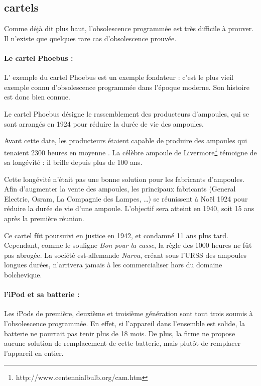 \subsection{cartels}



Comme déjà dit plus haut, l'obsolescence programmée est très difficile à prouver. Il n'existe que quelques rare cas d'obsolescence prouvée. 

\paragraph*{Le cartel Phoebus : } L' exemple du cartel Phoebus est un exemple fondateur : c'est le plus vieil exemple connu d'obsolescence programmée dans l'époque moderne. Son histoire est donc bien connue. 

Le cartel Phoebus désigne le rassemblement des producteurs d'ampoules, qui se sont arrangés en 1924 pour réduire la durée de vie des ampoules. 

Avant cette date, les producteurs étaient capable de produire des ampoules qui tenaient 2300 heures en moyenne \cite{opes_PHOEBUS}. La célèbre ampoule de Livermore\footnote{http://www.centennialbulb.org/cam.htm} témoigne de sa longévité : il brille depuis plus de 100 ans. 

Cette longévité n'était pas une bonne solution pour les fabricants d'ampoules. Afin d'augmenter la vente des ampoules,  les principaux fabricants (General Electric, Osram, La Compagnie des Lampes, \dots) se réunissent à Noël 1924 pour réduire la durée de vie d'une ampoule. L'objectif sera atteint  en 1940, soit 15 ans après la première réunion. 

Ce cartel fût poursuivi en justice en 1942, et condamné 11 ans plus tard. Cependant, comme le souligne \textit{Bon pour la casse}, la règle des 1000 heures ne fût pas abrogée. La société est-allemande \textit{Narva}, créant sous l'URSS des ampoules longues durées, n'arrivera jamais à les commercialiser hors du domaine bolchevique. 

\paragraph*{l'iPod et sa batterie : } Les iPods de première, deuxième et troisième génération sont tout trois soumis à l'obsolescence programmée. En effet, si l'appareil dans l'ensemble est solide, la batterie ne pourrait pas tenir plus de 18 mois. De plus, la firme ne propose aucune solution de remplacement de cette batterie, mais plutôt de remplacer l'appareil en entier. 

